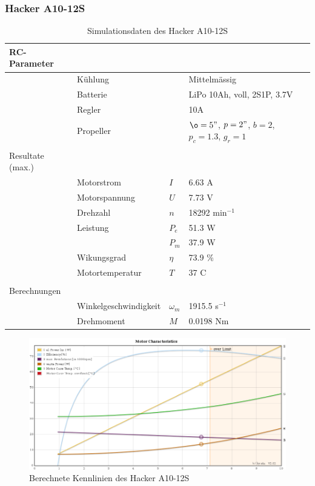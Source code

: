 \subsubsection*{Hacker A10-12S}

\begin{table}[h!]
	\centering
	\begin{tabular}{l l l l}
		RC-Parameter & & & \\ \hline
			& Kühlung	& & Mittelmässig \\
			& Batterie	& & LiPo 10Ah, voll, 2S1P, 3.7V \\
			& Regler	& & 10A \\
			& Propeller	& & $\o=5"$, $p=2"$, $b=2$, $p_c=1.3$, $g_r=1$ \\
			& & & \\
		Resultate (max.) & & & \\ \hline
			& Motorstrom	& $I$	& 6.63 A \\
			& Motorspannung	& $U$	& 7.73 V \\
			& Drehzahl	& $n$	& 18292 min$^{-1}$ \\
			& Leistung 	& $P_e$	& 51.3 W \\
			&		& $P_m$	& 37.9 W \\
			& Wikungsgrad	& $\eta$& 73.9 \% \\
			& Motortemperatur
					& $T$	& 37 C \\
			& & & \\
		Berechnungen & & & \\ \hline
			& Winkelgeschwindigkeit
					& $\omega_m$	& 1915.5 s$^{-1}$ \\
			& Drehmoment	& $M$		& 0.0198 Nm
	\end{tabular}
	\caption{Simulationsdaten des Hacker A10-12S}
\end{table}

\begin{figure}[h!]
	\centering
	\includegraphics[width=1\textwidth]{../../fig/motor/ecalc_A10-12S.png}
	\caption{Berechnete Kennlinien des Hacker A10-12S}
	\label{fig:ecalc_A10-12S}
\end{figure}
